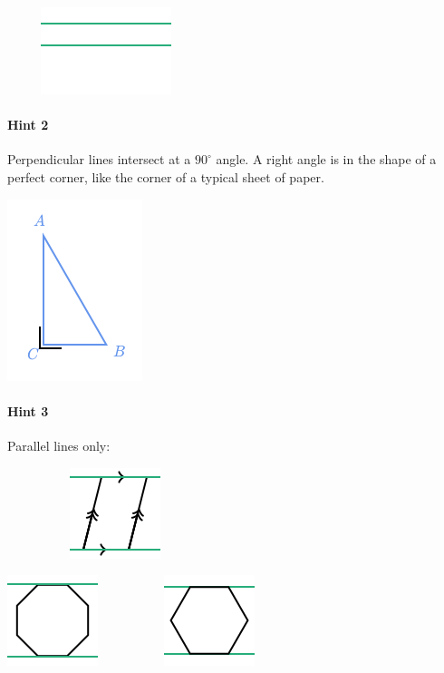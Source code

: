 \documentclass[twocolumn,10pt]{article}
\def\shrinkfactor{0.55}
\begin{document}
$\phantom{xxxx}$
\includegraphics[scale=\shrinkfactor]{figures/7cf1fbfb7516a57d37ad80007a3886c81c33f393.png}

\paragraph{Hint 2} Perpendicular lines intersect at a $90 ^\circ$ angle.  
A right angle is in the shape of a perfect corner, like the corner of a typical sheet of paper.


\includegraphics[scale=\shrinkfactor]{figures/497661f48f441186b5e021d8ca8c4f0c7449214f.png}

\paragraph{Hint 3}Parallel lines only:

$\phantom{xxxxxxxx}$
\includegraphics[scale=\shrinkfactor]{figures/dc97e97ad57144cae5a8b5bfdc5d541d8d66aa00.png}

\includegraphics[scale=\shrinkfactor]{figures/f73cb50d59bdab17965cbcf6a6832a26002948cb.png}  
$\phantom{xxxxxxxx}$
\includegraphics[scale=\shrinkfactor]{figures/a8914ec8b688d03af4fc47bdfdb83edcce453d65.png}
\end{document}
